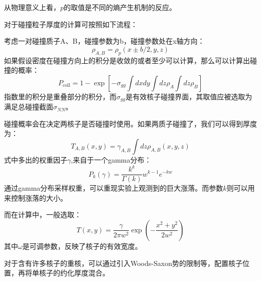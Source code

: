 \documentclass[aps,pre,12pt,preprint,onecolumn,showpacs,showkeys]{revtex4-1}
\begin{document}
从物理意义上看，$p$的取值是不同的熵产生机制的反应。\par
对于碰撞粒子厚度的计算可按照如下流程：\par
考虑一对碰撞质子A、B，碰撞参数为b，碰撞参数处在x轴方向：
\begin{equation}
    \rho_{A,B}=\rho_{p}(x\pm b/2,y,z)
\end{equation}
如果假设密度在碰撞方向上的积分是收敛的或者至少可以计算，那么可以计算出碰撞的概率：
\begin{equation}
    P_{\mathrm{coll}}=1-\exp \left[-\sigma_{g g} \int d x d y \int d z \rho_{A} \int d z \rho_{B}\right]
\end{equation}
指数里的积分是重叠部分的积分，而$\sigma_{gg}$是有效核子碰撞界面，其取值应被选取为满足总碰撞截面$\sigma_{NN}$。
\par
碰撞概率会在决定两核子是否碰撞时使用。如果两质子碰撞了，我们可以得到厚度为：
\begin{equation}
    T_{A,B}(x,y)=\gamma_{A,B}\int dz \rho_{A,B}(x,y,z)
\end{equation}
式中多出的权重因子$\gamma$,来自于一个gamma分布：
\begin{equation}
    P_{k}(\gamma)=\frac{k^{k}}{\Gamma(k)} w^{k-1} e^{-k w}
\end{equation}
通过gamma分布采样权重，可以重现实验上观测到的巨大涨落。而参数$k$则可以用来控制涨落的大小。\par
而在计算中，一般选取：
\begin{equation}
    T(x, y)=\frac{\gamma}{2 \pi w^{2}} \exp \left(-\frac{x^{2}+y^{2}}{2 w^{2}}\right)
\end{equation}
其中$\omega$是可调参数，反映了核子的有效宽度。\par
对于含有许多核子的重核，可以通过引入Woods-Saxon势的限制等，配置核子位置，再将单核子的约化厚度混合。
\end{document}
